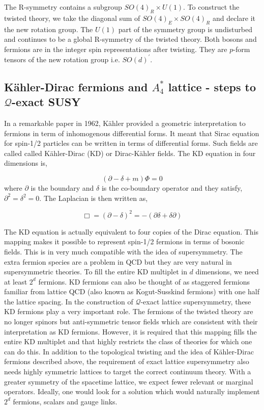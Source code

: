 The R-symmetry contains a subgroup $SO(4)_{R} \times U(1)$. 
To construct the twisted theory, we take the diagonal sum of $SO(4)_{E} \times SO(4)_{R}$ and declare it the new rotation group. 
The $U(1)$ part of the symmetry group is undisturbed and continues to be a global R-symmetry of the twisted theory.
Both bosons and fermions are in the integer spin representations after twisting. They are $p$-form tensors of the 
new rotation group i.e. $SO(d)^{\prime}$. 





\subsection{K\"{a}hler-Dirac fermions and $A_{4}^{*}$ lattice - steps to $\mathcal{Q}$-exact SUSY} 

In a remarkable paper in 1962, K\"{a}hler provided a geometric interpretation to fermions in term of inhomogenous differential forms. 
It meant that Sirac equation for spin-1/2 particles can be written in terms of differential forms. Such fields are called called
K\"{a}hler-Dirac (KD) or Dirac-K\"{a}hler fields. The KD equation in four dimensions is, 

\begin{equation}
(\partial - \delta + m) \Phi = 0 
\end{equation}
where $\partial$ is the boundary and $\delta$ is the co-boundary operator and they satisfy, $\partial^2 = \delta^2 = 0$. The Laplacian is then written as,

\begin{equation}
\Box = (\partial - \delta)^{2} = -(\partial \delta + \delta \partial)
\end{equation}

The KD equation is actually equivalent to four copies of the Dirac equation. This mapping makes it possible to represent 
spin-1/2 fermions in terms of bosonic fields. This is in very much compatible with the idea of supersymmetry. The 
extra fermion species are a problem in QCD but they are very natural in supersymmetric theories. To fill the entire 
KD multiplet in $d$ dimensions,
we need at least $2^d$ fermions. KD fermions can also be thought of as staggered fermions familiar from lattice 
QCD (also known as Kogut-Susskind fermions) with one half the lattice spacing. 
In the construction of $\mathcal{Q}$-exact lattice supersymmetry, these KD fermions play a very important role. 
The fermions of the twisted theory are no longer spinors but anti-symmetric tensor fields which are consistent with 
their interpretation as KD fermions. However, it is required that this mapping fills the entire KD multiplet and that 
highly restricts the class of theories for which one can do this. 
In addition to the topological twisting and the idea of K\"{a}hler-Dirac fermions described above, the requirement of 
exact lattice supersymmetry also needs highly symmetric lattices to target the correct continuum theory. 
With a greater symmetry of the spacetime lattice, we expect fewer relevant or marginal operators. 
Ideally, one would look for a solution which would naturally implement $2^{d}$ fermions, scalars and gauge links. 


